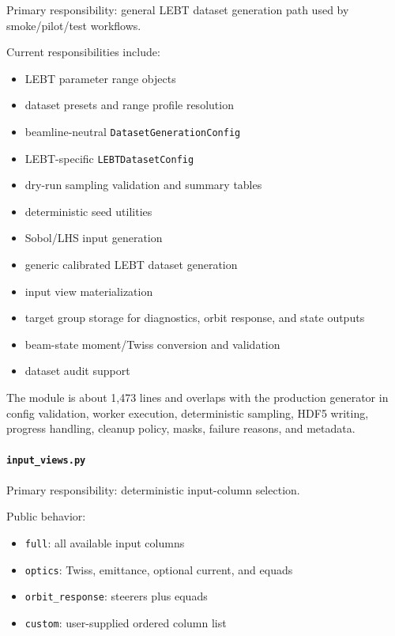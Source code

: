 \documentclass[
]{article}
\providecommand{\tightlist}{%
  \setlength{\itemsep}{0pt}\setlength{\parskip}{0pt}}
\begin{document}
Primary responsibility: general LEBT dataset generation path used by
smoke/pilot/test workflows.

Current responsibilities include:

\begin{itemize}
\tightlist
\item
  LEBT parameter range objects
\item
  dataset presets and range profile resolution
\item
  beamline-neutral \texttt{DatasetGenerationConfig}
\item
  LEBT-specific \texttt{LEBTDatasetConfig}
\item
  dry-run sampling validation and summary tables
\item
  deterministic seed utilities
\item
  Sobol/LHS input generation
\item
  generic calibrated LEBT dataset generation
\item
  input view materialization
\item
  target group storage for diagnostics, orbit response, and state
  outputs
\item
  beam-state moment/Twiss conversion and validation
\item
  dataset audit support
\end{itemize}

The module is about 1,473 lines and overlaps with the production
generator in config validation, worker execution, deterministic
sampling, HDF5 writing, progress handling, cleanup policy, masks,
failure reasons, and metadata.

\hypertarget{input_views.py}{%
\paragraph{\texorpdfstring{\texttt{input\_views.py}}{input\_views.py}}\label{input_views.py}}

Primary responsibility: deterministic input-column selection.

Public behavior:

\begin{itemize}
\tightlist
\item
  \texttt{full}: all available input columns
\item
  \texttt{optics}: Twiss, emittance, optional current, and equads
\item
  \texttt{orbit\_response}: steerers plus equads
\item
  \texttt{custom}: user-supplied ordered column list
\end{itemize}
\end{document}
